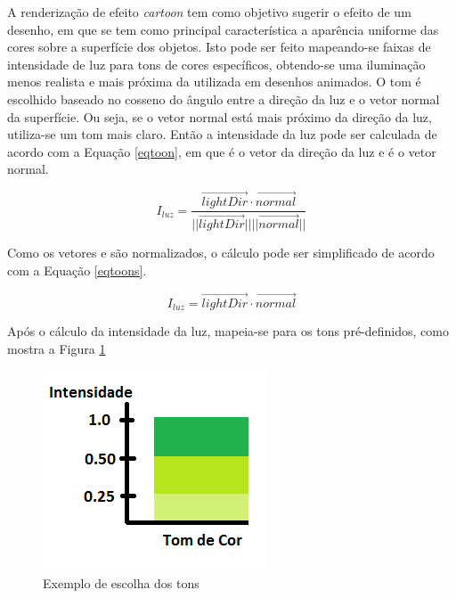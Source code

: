 {	A renderização de efeito \textit{cartoon} tem como objetivo sugerir o efeito de um desenho, em que se tem como principal característica a aparência uniforme das cores sobre a superfície dos objetos. Isto pode ser feito mapeando-se faixas de intensidade de luz para tons de cores específicos, obtendo-se uma iluminação menos realista e mais próxima da utilizada em desenhos animados. O tom é escolhido baseado no cosseno do ângulo entre a direção da luz e o vetor normal da superfície. Ou seja, se o vetor normal está mais próximo da direção da luz, utiliza-se um tom mais claro.  Então a intensidade da luz pode ser calculada de acordo com a Equação \ref{eqtoon}, em que  é o vetor da direção da luz e  é o vetor normal.

	\begin{equation}
		I_ {luz} = \frac{ \overrightarrow{lightDir} \cdot \overrightarrow{normal} } {| | \overrightarrow{lightDir} | |  | | \overrightarrow{normal} | | } 
	\label{eqtoon}
	\end{equation}

	Como os vetores  e  são normalizados, o cálculo pode ser simplificado de acordo com a Equação \ref{eqtoons}.

	\begin{equation}
		I_ {luz} =  \overrightarrow{lightDir} \cdot \overrightarrow{normal}  
	\label{eqtoons}
	\end{equation}

	Após o cálculo da intensidade da luz, mapeia-se para os tons pré-definidos, como mostra a Figura \ref{tons}

	\begin{figure}[ht]
	\centering
		\includegraphics[keepaspectratio=true,scale=1.0]{figuras/tomcor.png}
	\caption{Exemplo de escolha dos tons}
	\label{tons}
	\end{figure}

}
